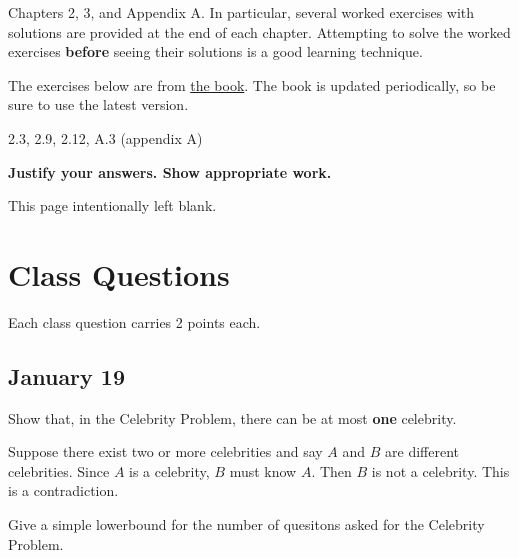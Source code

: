 \documentclass[draft]{article}
\begin{document}
\begin{titlepage}
    \begin{tcolorbox}[title=Reading,fonttitle=\bfseries]
        Chapters 2, 3, and Appendix A. In particular, several worked exercises with solutions are provided at the end of each chapter. Attempting to solve the worked exercises \textbf{before} seeing their solutions is a good learning technique.
    \end{tcolorbox}
    The exercises below are from \href{https://sites.google.com/site/gopalpandurangan/home/algorithms-course}{the book}. The book is updated periodically, so be sure to use the latest version.

    \begin{tcolorbox}[title=Exercises,fonttitle=\bfseries]
        2.3, 2.9, 2.12, A.3 (appendix A)
    \end{tcolorbox}

    \textbf{Justify your answers. Show appropriate work.}
\end{titlepage}
\vspace*{\fill}\begin{center}{\Huge This page intentionally left blank.}\end{center}\vspace*{\fill}\thispagestyle{empty}\clearpage
{}

\section{Class Questions}
Each class question carries 2 points each.
\subsection{January 19}

\begin{question}
    Show that, in the Celebrity Problem, there can be at most \textbf{one} celebrity.
\end{question}

\begin{solution}
    Suppose there exist two or more celebrities and say $A$ and $B$ are different celebrities. Since $A$ is a celebrity, $B$ must know $A$. Then $B$ is not a celebrity. This is a contradiction.
\end{solution}

\begin{question}
    Give a simple lowerbound for the number of quesitons asked for the Celebrity Problem.
\end{question}
\end{document}
